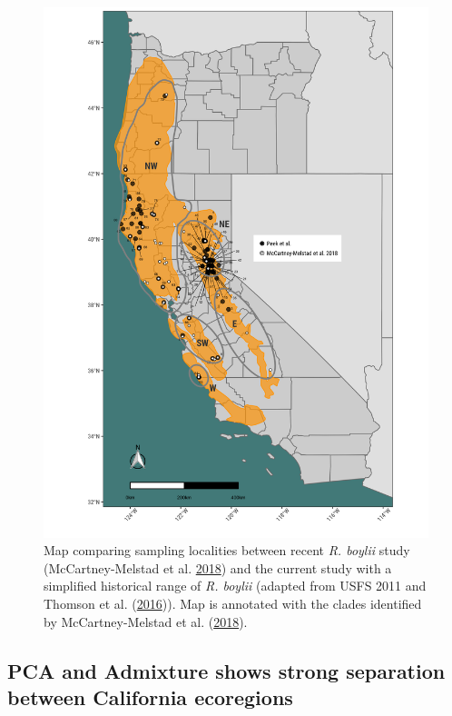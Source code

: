 \documentclass[proquest,12pt,final]{ucthesis-CA2012} %
\begin{document}
\begin{ucmainmatter}
\begin{figure}
\includegraphics[width=0.85\linewidth]{figure/ch3/fig_01_maps_all_rabo_filt10_1_100k_revrange_localities_annotated} \caption{Map comparing sampling localities between recent \emph{R.
boylii} study (McCartney-Melstad et al.
\protect\hyperlink{ref-mccartney-melstad_population_2018}{2018}) and the
current study with a simplified historical range of \emph{R. boylii}
(adapted from USFS 2011 and Thomson et al.
(\protect\hyperlink{ref-thomson_california_2016}{2016})). Map is
annotated with the clades identified by McCartney-Melstad et al.
(\protect\hyperlink{ref-mccartney-melstad_population_2018}{2018}).}\label{fig:CH3F1map}
\end{figure}
\clearpage

\hypertarget{pca-and-admixture-shows-strong-separation-between-california-ecoregions}{%
\subsection{PCA and Admixture shows strong separation between California
ecoregions}\label{pca-and-admixture-shows-strong-separation-between-california-ecoregions}}


\end{ucmainmatter}
\end{document}
